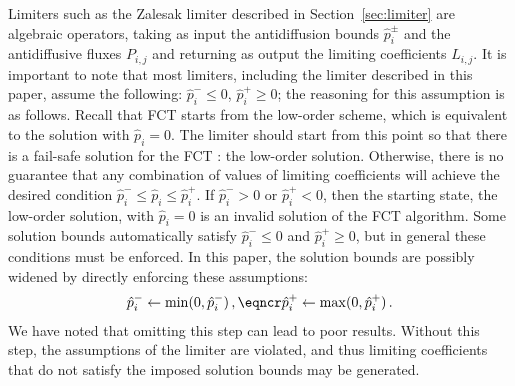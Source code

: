 \documentclass[xchauthor,chkrefs,fixeqskip,GCNS,amsmath,amsthm]{yjcphg}
\theoremstyle{remark}
\begin{document}
Limiters such as the Zalesak limiter described in Section~\ref{sec:limiter}
are algebraic operators, taking as input the antidiffusion bounds
$\hat{p}_{i}^{\pm}$ and the antidiffusive fluxes $P_{i,j}$ and
returning as
output the limiting coefficients $L_{i,j}$. It is important to note
that most
limiters, including the limiter described in this paper, assume the
following: $\hat{p}_{i} ^{-}\leq0$, $\hat{p}_{i}^{+}\geq0$; the reasoning
for this assumption is as follows. Recall that FCT starts from the low-order
scheme, which is equivalent to the solution with $\hat{p}_{i}=0$. The limiter
should start from this point so that there is a fail-safe solution for the
FCT : the low-order solution. Otherwise, there is no guarantee that
any combination of values of limiting coefficients will achieve the desired
condition $\hat{p}_{i}^{-}\leq\hat{p}_{i}\leq\hat{p}_{i} ^{+}$. If
$\hat{p}_{i}^{-} > 0$ or $\hat{p}_{i}^{+} < 0$, then the starting
state, the
low-order solution, with $\hat{p}_{i}=0$ is an invalid solution of the FCT
algorithm. Some solution bounds automatically satisfy $\hat
{p}_{i}^{-}\leq0$
and $\hat{p}_{i}^{+} \geq0$, but in general these conditions must be
enforced. In this paper, the solution bounds are possibly widened by directly
enforcing these assumptions:
%
\begin{eqnarray}[ll]
\hat{p}_{i}^{-} \gets\min(0,\hat{p}_{i}^{-}) \,,\eqncr
\hat{p}_{i}^{+} \gets\max(0,\hat{p}_{i}^{+}) \,.
\end{eqnarray}
%
We have noted that omitting this step can lead to poor results. Without this
step, the assumptions of the limiter are violated, and thus limiting
coefficients that do not satisfy the imposed solution bounds may be
generated.

\end{document}
